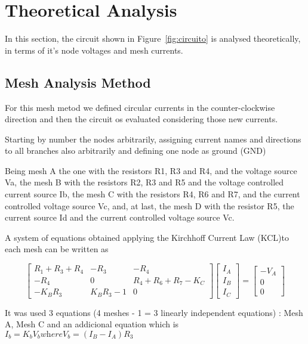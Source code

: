 \section{Theoretical Analysis}
\label{sec:analysis}

\hspace{0,5cm} In this section, the circuit shown in Figure~\ref{fig:circuito} is analysed theoretically, in terms of it's node voltages and mesh currents.

\subsection{Mesh Analysis Method}

\hspace{0,5cm} 
For this mesh metod we defined circular currents in the counter-clockwise direction and then the circuit os evaluated considering those new currents.

Starting by number the nodes arbitrarily, assigning current names and directions to all branches also arbitrarily and defining one node as ground (GND) 

Being mesh A the one with the resistors R1, R3 and R4, and the voltage source Va, the mesh B with the resistors R2, R3 and R5 and the voltage controlled current source Ib, the mesh C with the resistors R4, R6 and R7, and the current controlled voltage source Vc, and, at last, the mesh D with the resistor R5, the current source Id and the current controlled voltage source Vc. 

A system of equations obtained applying the Kirchhoff Current Law (KCL)to each mesh can be written as 

\begin{equation}
\begin{bmatrix} 
R_1 + R_3 + R_4 & -R_3 & -R_4 \\ 
-R_4 & 0 & R_4 + R_6 + R_7 - K_C\\
-K_B R_3 & K_B R_3 - 1 & 0
\end{bmatrix} 
\begin{bmatrix} 
I_A \\ 
I_B \\ 
I_C
\end{bmatrix} =
\begin{bmatrix} 
-V_A \\ 
0 \\ 
0
\end{bmatrix}
\end{equation}

It was used 3 equations (4 meshes - 1 = 3 linearly independent equations) : Mesh A, Mesh C and an addicional equation which is $I_b = K_b V_b \textit{where} V_b = (I_B - I_A)R_3$ 

